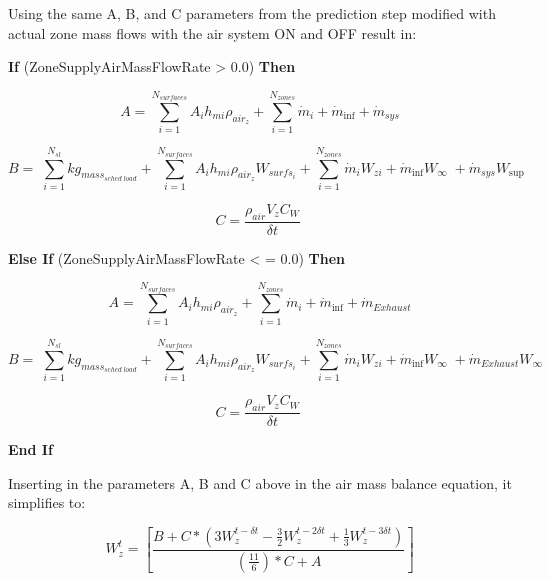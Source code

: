 Using the same A, B, and C parameters from the prediction step modified with actual zone mass flows with the air system ON and OFF result in:

\textbf{If} (ZoneSupplyAirMassFlowRate \textgreater{} 0.0) \textbf{Then}

\begin{equation}
A = \sum\limits_{i = 1}^{{N_{surfaces}}} {{A_i}{h_{mi}}} {\rho_{ai{r_z}}} + \sum\limits_{i = 1}^{{N_{zones}}} {{{\dot m}_i}}  + {\dot m_{\inf }} + {\dot m_{sys}}
\end{equation}

\begin{equation}
B = \;\sum\limits_{i = 1}^{{N_{sl}}} {k{g_{mas{s_{sched\;load}}}}}  + \sum\limits_{i = 1}^{{N_{surfaces}}} {{A_i}{h_{mi}}} {\rho_{ai{r_z}}}{W_{surf{s_i}}} + \sum\limits_{i = 1}^{{N_{zones}}} {{{\dot m}_i}} {W_{zi}} + {\dot m_{\inf }}{W_\infty }\; + {\dot m_{sys}}{W_{\sup }}
\end{equation}

\begin{equation}
C = \frac{{{\rho_{air}}{V_z}{C_W}}}{{\delta t}}\;
\end{equation}

\textbf{Else If} (ZoneSupplyAirMassFlowRate \textless{} = 0.0) \textbf{Then}

\begin{equation}
A = \sum\limits_{i = 1}^{{N_{surfaces}}} {{A_i}{h_{mi}}} {\rho_{ai{r_z}}} + \sum\limits_{i = 1}^{{N_{zones}}} {{{\dot m}_i}}  + {\dot m_{\inf }} + {\dot m_{Exhaust}}
\end{equation}

\begin{equation}
B = \;\sum\limits_{i = 1}^{{N_{sl}}} {k{g_{mas{s_{sched\;load}}}}}  + \sum\limits_{i = 1}^{{N_{surfaces}}} {{A_i}{h_{mi}}} {\rho_{ai{r_z}}}{W_{surf{s_i}}} + \sum\limits_{i = 1}^{{N_{zones}}} {{{\dot m}_i}} {W_{zi}} + {\dot m_{\inf }}{W_\infty }\; + {\dot m_{Exhaust}}{W_\infty }
\end{equation}

\begin{equation}
C = \frac{{{\rho_{air}}{V_z}{C_W}}}{{\delta t}}\;
\end{equation}

\textbf{End If}

Inserting in the parameters A, B and C above in the air mass balance equation, it simplifies to:

\begin{equation}
  W_z^t = \left[ {\frac{{B + C * \left( {3W_z^{t - \delta t} - {\frac{3}{2}} W_z^{t - 2\delta t} + {\frac{1}{3}}W_z^{t - 3\delta t}} \right)}}{{\left( {\frac{11}{6}} \right) * C + A}}} \right]
\end{equation}

